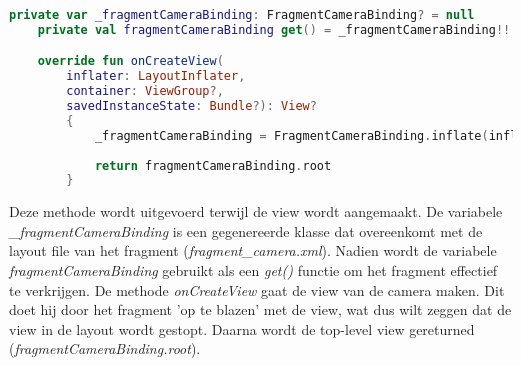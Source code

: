 \begin{lstlisting}[language=Kotlin, caption=onCreateView in CameraFragment.kt]
    private var _fragmentCameraBinding: FragmentCameraBinding? = null
    private val fragmentCameraBinding get() = _fragmentCameraBinding!!

    override fun onCreateView(
        inflater: LayoutInflater,
        container: ViewGroup?,
        savedInstanceState: Bundle?): View?
        {
            _fragmentCameraBinding = FragmentCameraBinding.inflate(inflater,container,false)
    
            return fragmentCameraBinding.root
        }
\end{lstlisting}
Deze methode wordt uitgevoerd terwijl de view wordt aangemaakt. De variabele \emph{\_fragmentCameraBinding} is een gegenereerde klasse dat overeenkomt met de layout file van het fragment (\emph{fragment\_camera.xml}). Nadien wordt de variabele \emph{fragmentCameraBinding} gebruikt als een \emph{get()} functie om het fragment effectief te verkrijgen. De methode \emph{onCreateView} gaat de view van de camera maken. Dit doet hij door het fragment 'op te blazen' met de view, wat dus wilt zeggen dat de view in de layout wordt gestopt. Daarna wordt de top-level view gereturned (\emph{fragmentCameraBinding.root}).

